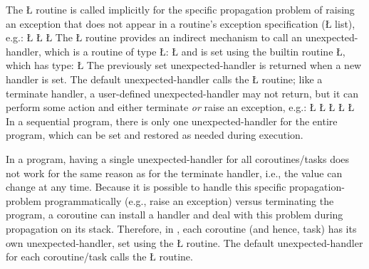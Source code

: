 \documentclass[openright,twoside]{report}
\begin{document}
The \LGinlinetrue\LGbegin\lgrinde\L{}\endlgrinde\LGend{} routine is called implicitly for the specific propagation problem of raising an exception that does not appear in a routine's exception specification (\LGinlinetrue\LGbegin\lgrinde\L{}\endlgrinde\LGend{} list), e.g.:
\LGinlinefalse\LGbegin\lgrinde
\L{}
\CE{}\L{\LB{}}
\CE{}\L{\LB{\}}}
\endlgrinde\LGend
The \LGinlinetrue\LGbegin\lgrinde\L{}\endlgrinde\LGend{} routine provides an indirect mechanism to call an unexpected-handler, which is a routine of type \LGinlinetrue\LGbegin\lgrinde\L{}\endlgrinde\LGend{}:
\LGinlinefalse\LGbegin\lgrinde
\L{}
\endlgrinde\LGend
and is set using the builtin routine \LGinlinetrue\LGbegin\lgrinde\L{}\endlgrinde\LGend{}, which has type:
\LGinlinefalse\LGbegin\lgrinde
\L{}
\endlgrinde\LGend
The previously set unexpected-handler is returned when a new handler is set.
The default unexpected-handler calls the \LGinlinetrue\LGbegin\lgrinde\L{}\endlgrinde\LGend{} routine;
like a terminate handler, a user-defined unexpected-handler may not return, but it can perform some action and either terminate \emph{or} raise an exception, e.g.:
\LGinlinefalse\LGbegin\lgrinde
\L{}
\L{\LB{}}
\CE{}\L{\LB{}}
\CE{}\L{\LB{\}}}
\L{}
\endlgrinde\LGend
In a sequential program, there is only one unexpected-handler for the entire program, which can be set and restored as needed during execution.

In a \uC program, having a single unexpected-handler for all coroutines/tasks does not work for the same reason as for the terminate handler, i.e., the value can change at any time.
Because it is possible to handle this specific propagation-problem programmatically (e.g., raise an exception) versus terminating the program, a coroutine can install a handler and deal with this problem during propagation on its stack.
Therefore, in \uC, each coroutine (and hence, task) has its own unexpected-handler, set using the \LGinlinetrue\LGbegin\lgrinde\L{}\endlgrinde\LGend{} routine.
The default unexpected-handler for each coroutine/task calls the \LGinlinetrue\LGbegin\lgrinde\L{}\endlgrinde\LGend{} routine.
\end{document}
